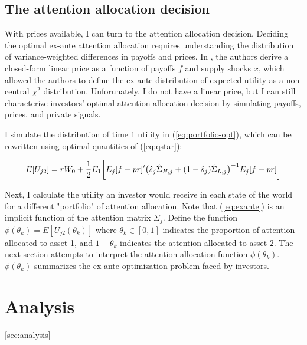 \documentclass{article}
\begin{document}
\subsection{The attention allocation decision}

With prices available, I can turn to the attention allocation decision. Deciding the optimal ex-ante attention allocation requires understanding the distribution of variance-weighted differences in payoffs and prices. In \textcite{kacperczyk_rational_2016}, the authors derive a closed-form linear price as a function of payoffs $f$ and supply shocks $x$, which allowed the authors to define the ex-ante distribution of expected utility as a non-central $\chi^2$ distribution. Unforunately, I do not have a linear price, but I can still characterize investors' optimal attention allocation decision by simulating payoffs, prices, and private signals.

I simulate the distribution of time 1 utility in (\ref{eq:portfolio-opt}), which can be rewritten using optimal quantities of (\ref{eq:qstar}):

\begin{align}\label{eq:exante}
    E[U_{j2}] = r W_0 + \frac{1}{2} E_1\bigg[ E_j[f - pr]'\big(\hat s_j \hat \Sigma_{H,j} + (1-\hat s_j) \hat \Sigma_{L,j}\big)^{-1}E_j[f - pr] \bigg]
\end{align}

Next, I calculate the utility an investor would receive in each state of the world for a different "portfolio" of attention allocation. Note that (\ref{eq:exante}) is an implicit function of the attention matrix $\Sigma_j$. Define the function $\phi(\theta_k) = E[U_{j2}(\theta_k)]$ where $\theta_k \in [0,1]$ indicates the proportion of attention allocated to asset 1, and $1-\theta_k$ indicates the attention allocated to asset 2. The next section attempts to interpret the attention allocation function $\phi(\theta_k)$. $\phi(\theta_k)$ summarizes the ex-ante optimization problem faced by investors.

\section{Analysis}\ref{sec:analysis}
\end{document}
